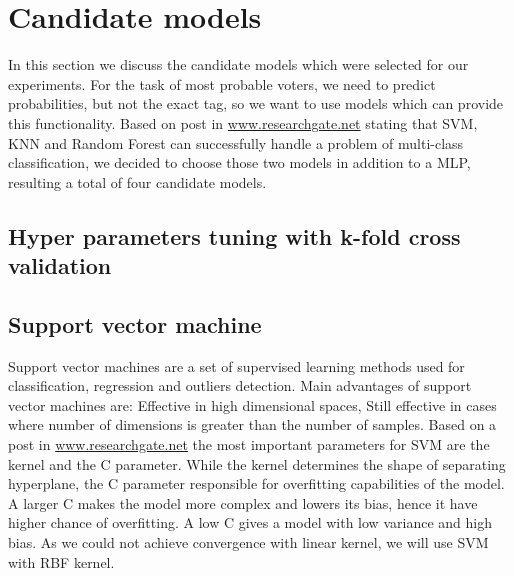 \documentclass[12pt]{article}
\begin{document}
\newpage
\section{Candidate models}
In this section we discuss the candidate models which were selected for our experiments. For the task of most probable voters, we need to predict probabilities, but not the exact tag, so we want to use models which can provide this functionality. Based on post in \href{https://www.researchgate.net/post/What_are_the_best_supervised_classifiers_to_classify_the_problem_of_multiclass_classification}{www.researchgate.net} stating that SVM, KNN and Random Forest can successfully handle a problem of multi-class classification, we decided to choose those two models in addition to a MLP, resulting a total of four candidate models.

\subsection{Hyper parameters tuning with k-fold cross validation}

\newpage
\subsection{Support vector machine}
Support vector machines are a set of supervised learning methods used for classification, regression and outliers detection. Main advantages of support vector machines are: Effective in high dimensional spaces, Still effective in cases where number of dimensions is greater than the number of samples. Based on a post in  \href{https://www.researchgate.net/post/Is_it_necessary_to_choose_kernels_in_SVM_according_to_application}{www.researchgate.net} the most important parameters for SVM are the kernel and the C parameter. While the kernel determines the shape of separating hyperplane, the C parameter responsible for overfitting capabilities of the model. A larger C makes the model more complex and lowers its bias, hence it have higher chance of overfitting. A low C gives a model with low variance and high bias. As we could not achieve convergence with linear kernel, we will use SVM with RBF kernel.
\end{document}
